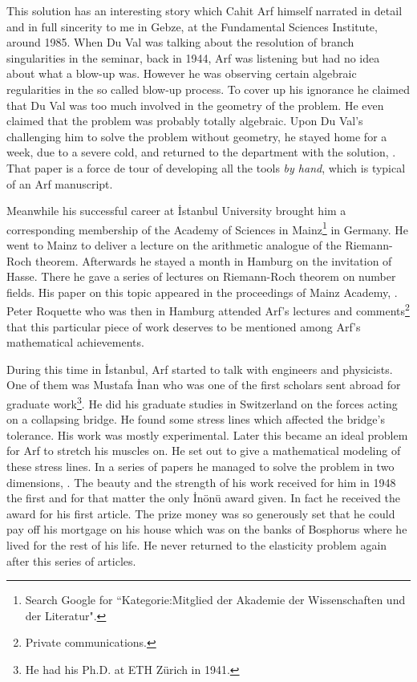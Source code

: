 \documentclass[12pt]{amsart}
\begin{document}
This solution has an interesting story which Cahit Arf himself narrated in detail and in full sincerity to me in Gebze, at the Fundamental Sciences Institute,  around 1985. When Du Val was talking about the resolution of branch singularities in the seminar, back in 1944, Arf was listening but had no idea about what a blow-up was. However he was observing certain algebraic regularities in the so called blow-up process. To cover up his ignorance he claimed  that Du Val was too much involved in the geometry of the problem. He even claimed that the problem was probably totally algebraic. Upon Du Val's challenging him to solve the problem without geometry, he stayed home for a week, due to a severe cold, and returned to the department with the solution, \cite{carf8}. That paper is a force de tour of developing all the tools \emph{by hand}, which is typical of an Arf manuscript.

Meanwhile his successful career at {\.I}stanbul University brought him a corresponding membership of the Academy of Sciences in Mainz\footnote{Search Google for ``Kategorie:Mitglied der Akademie der Wissenschaften und der Literatur".} in Germany. He went to Mainz
to deliver a lecture on the arithmetic analogue of
the Riemann-Roch theorem. Afterwards he stayed a month in Hamburg on the invitation of Hasse. There he gave a series of lectures on Riemann-Roch theorem on number fields. His paper on this topic appeared in the proceedings of Mainz Academy, \cite{carf20}. Peter Roquette who was then in Hamburg attended Arf's lectures and comments\footnote{Private communications.} that this particular piece of work deserves to be mentioned among Arf's mathematical achievements.

During this time in {\.I}stanbul, Arf started to talk with engineers and physicists. One of them was Mustafa {\.I}nan who was one of the first scholars sent abroad for graduate work\footnote{He had his Ph.D. at ETH Z\"{u}rich in 1941.}. He did his graduate studies in Switzerland on the forces acting on a collapsing bridge. He found some stress lines which affected the bridge's tolerance. His work was mostly experimental. Later this became an ideal problem for Arf to stretch his muscles on. He set out to give a mathematical modeling of these stress lines. In a series of papers he managed to solve the problem in two dimensions, \cite{carf9, carf10, carf12, carf13, carf16, carf17}.  The beauty and the strength of his work received for him in 1948 the first and for that matter the only {\.I}n\"{o}n\"{u} award given.
In fact he received the award for his first article.
The prize money was so generously set that he could pay off his mortgage on his house which was on the banks of Bosphorus where he lived for the rest of his life. He never returned to the elasticity problem again after this series of articles.
\end{document}

